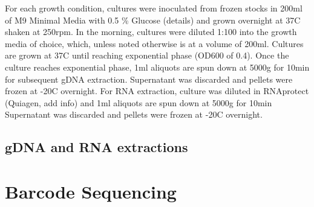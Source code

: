 For each growth condition, cultures were inoculated from frozen stocks in 200ml of M9 Minimal Media with 0.5 \% Glucose (details) and grown overnight at 37C shaken at 250rpm. In the morning, cultures were diluted 1:100 into the growth media of choice, which, unless noted otherwise is at a volume of 200ml. Cultures are grown at 37C until reaching exponential phase (OD600 of 0.4). Once the culture reaches exponential phase, 1ml aliquots are spun down at 5000g for 10min for subsequent gDNA extraction. Supernatant was discarded and pellets were frozen at -20C overnight. For RNA extraction, culture was diluted in RNAprotect (Quiagen, add info) and 1ml aliquots are spun down at 5000g for 10min Supernatant was discarded and pellets were frozen at -20C overnight.

\subsection{gDNA and RNA extractions}
\label{sec:dna_rna_extract}


\section{Barcode Sequencing}
\label{sec:barcode_seq}




